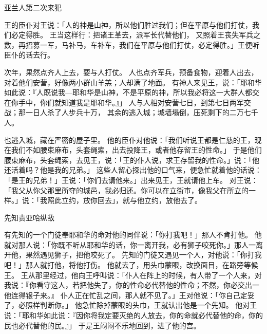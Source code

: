 {\par }{\SH 亚兰人第二次来犯
\par }{\PP {}王的臣仆对{}王说：「{}人的神是山神，所以他们胜过我们；但在平原与他们打仗，我们必定得胜。
王当这样行：把诸王革去，派军长代替他们，
又照着王丧失军兵之数，再招募一军，马补马，车补车，我们在平原与他们打仗，必定得胜。」王便听臣仆的话去行。
\par }{\PP {}次年，{}果然点齐{}人上{}去，要与{}人打仗。
人也点齐军兵，预备食物，迎着{}人出去，对着他们安营，好像两小群山羊羔；{}人却满了地面。
有神人来见{}王，说：「耶和华如此说：『{}人既说我—耶和华是山神，不是平原的神，所以我必将这一大群人都交在你手中，你们就知道我是耶和华。』」
人与{}人相对安营七日，到第七日两军交战；那一日{}人杀了{}人步兵十万，
其余的逃入{}城；城墙塌倒，压死剩下的二万七千人。
\par }{也逃入城，藏在严密的屋子里。
他的臣仆对他说：「我们听说{}王都是仁慈的王，现在我们不如腰束麻布，头套绳索，出去投降{}王，或者他存留王的性命。」
于是他们腰束麻布，头套绳索，去见{}王，说：「王的仆人{}说，求王存留我的性命。」{}说：「他还活着吗？他是我的兄弟。」
这些人留心探出他的口气来，便急忙就着他的话说：「{}是王的兄弟！」王说：「你们去请他来。」{}出来见王，王就请他上车。
对王说：「我父从你父那里所夺的城邑，我必归还。你可以在{}立街市，像我父在{}所立的一样。」{}说：「我照此立约，放你回去」，就与他立约，放他去了。
\par }{\SH 先知责亚哈纵敌
\par }{\PP {}有先知的一个门徒奉耶和华的命对他的同伴说：「你打我吧！」那人不肯打他。
他就对那人说：「你既不听从耶和华的话，你一离开我，必有狮子咬死你。」那人一离开他，果然遇见狮子，把他咬死了。
先知的门徒又遇见一个人，对他说：「你打我吧！」那人就打他，将他打伤。
他就去了，用头巾蒙眼，改换面目，在路旁等候王。
王从那里经过，他向王呼叫说：「仆人在阵上的时候，有人带了一个人来，对我说：『你看守这人，若把他失了，你的性命必代替他的性命；不然，你必交出一他连得银子来。』
仆人正在忙乱之间，那人就不见了。」{}王对他说：「你自己定妥了，必照样判断你。」
他急忙除掉蒙眼的头巾，{}王就认出他是一个先知。
他对王说：「耶和华如此说：『因你将我定要灭绝的人放去，你的命就必代替他的命，你的民也必代替他的民。』」
于是{}王闷闷不乐地回到{}，进了他的宫。

}
